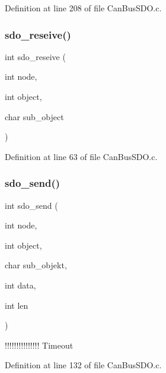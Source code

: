 Definition at line 208 of file Can\+Bus\+S\+D\+O.\+c.

\mbox{\label{_can_bus_s_d_o_8h_a6b768675f6e34d26d3ee6628c86e1c65}} 
\subsubsection{sdo\+\_\+reseive()}
{\footnotesize\ttfamily int sdo\+\_\+reseive (\begin{DoxyParamCaption}\item[{int}]{node,  }\item[{int}]{object,  }\item[{char}]{sub\+\_\+object }\end{DoxyParamCaption})}



Definition at line 63 of file Can\+Bus\+S\+D\+O.\+c.

\mbox{\label{_can_bus_s_d_o_8h_a9435e3649851e84785a945c1727f8879}} 
\subsubsection{sdo\+\_\+send()}
{\footnotesize\ttfamily int sdo\+\_\+send (\begin{DoxyParamCaption}\item[{int}]{node,  }\item[{int}]{object,  }\item[{char}]{sub\+\_\+objekt,  }\item[{int}]{data,  }\item[{int}]{len }\end{DoxyParamCaption})}

!!!!!!!!!!!!!!! Timeout 

Definition at line 132 of file Can\+Bus\+S\+D\+O.\+c.

